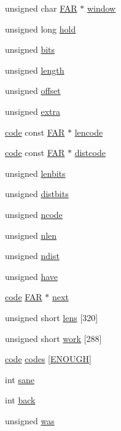 \begin{DoxyCompactItemize}
\item 
unsigned char \hyperlink{jmorecfg_8h_aef060b3456fdcc093a7210a762d5f2ed}{F\+A\+R} $\ast$ \hyperlink{structinflate__state_a9cc4c0bde426383731394dcf91c40673}{window}
\item 
unsigned long \hyperlink{structinflate__state_a5a91b1c59e52f1aa7eda75b86b05b843}{hold}
\item 
unsigned \hyperlink{structinflate__state_ab37c3563f306f29e6ded8e933af14365}{bits}
\item 
unsigned \hyperlink{structinflate__state_a5179d4c9b332d976cce7c6cce6bdf3c1}{length}
\item 
unsigned \hyperlink{structinflate__state_af1e38258e8585b1a37854066ef9d939c}{offset}
\item 
unsigned \hyperlink{structinflate__state_a5b7b0be77d61e8468716c7f265dd0780}{extra}
\item 
\hyperlink{structcode}{code} const \hyperlink{jmorecfg_8h_aef060b3456fdcc093a7210a762d5f2ed}{F\+A\+R} $\ast$ \hyperlink{structinflate__state_a4560e1eb3318f7ea41896be84de0679a}{lencode}
\item 
\hyperlink{structcode}{code} const \hyperlink{jmorecfg_8h_aef060b3456fdcc093a7210a762d5f2ed}{F\+A\+R} $\ast$ \hyperlink{structinflate__state_a19f7ae2fe2682cb1163860f6991a107f}{distcode}
\item 
unsigned \hyperlink{structinflate__state_a3ff97e6b230d7551fc848ff9de0236e9}{lenbits}
\item 
unsigned \hyperlink{structinflate__state_a98952f3f8f420a05b567f080aca0eb4b}{distbits}
\item 
unsigned \hyperlink{structinflate__state_a62b5ea8559856b315b6c89d9114c2109}{ncode}
\item 
unsigned \hyperlink{structinflate__state_a489b005f4fe214353cd80b77b4f23194}{nlen}
\item 
unsigned \hyperlink{structinflate__state_a4415e5e51efdd0c8672e4c601caa4762}{ndist}
\item 
unsigned \hyperlink{structinflate__state_a4a2b15912256bcf7b39980e15095ba58}{have}
\item 
\hyperlink{structcode}{code} \hyperlink{jmorecfg_8h_aef060b3456fdcc093a7210a762d5f2ed}{F\+A\+R} $\ast$ \hyperlink{structinflate__state_a872bf267d91efb4143e9cfb812e670bb}{next}
\item 
unsigned short \hyperlink{structinflate__state_aa0620e64487c48635f6c3a11a0aeb99d}{lens} \mbox{[}320\mbox{]}
\item 
unsigned short \hyperlink{structinflate__state_a85403907f7f5b9d355821ffa2591456c}{work} \mbox{[}288\mbox{]}
\item 
\hyperlink{structcode}{code} \hyperlink{structinflate__state_af9581f523a7d8d47fba6cdd73eaf1edc}{codes} \mbox{[}\hyperlink{inftrees_8h_acef2f42f16f168d23ec870bd60a3b5f1}{E\+N\+O\+U\+G\+H}\mbox{]}
\item 
int \hyperlink{structinflate__state_a98b40fe23b7177bc8cd1d9d73edad593}{sane}
\item 
int \hyperlink{structinflate__state_ab666ce74a806fc77200ced9bc385cb0b}{back}
\item 
unsigned \hyperlink{structinflate__state_a0e3af9175f6d3b30f83af69062ba4dec}{was}
\end{DoxyCompactItemize}


